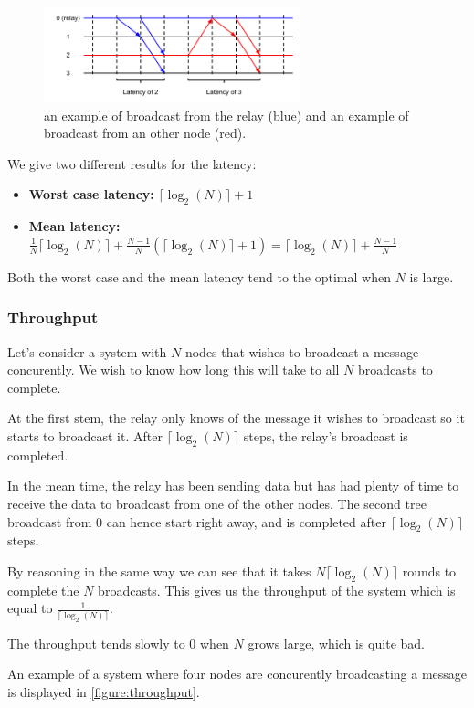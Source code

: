 \documentclass[a4paper]{article}
\begin{document}
\begin{figure}[h]
    \centering
    \includegraphics[width=280px]{Latency.png}
    \caption{an example of broadcast from the relay (blue) and an example of broadcast from an other node (red).}
    \label{figure:latency}
\end{figure}

We give two different results for the latency:
\begin{itemize}
    \item \textbf{Worst case latency:} $\lceil\log_2(N)\rceil + 1$
    \item \textbf{Mean latency:} $\frac{1}{N} \lceil\log_2(N)\rceil +
        \frac{N-1}{N} (\lceil\log_2(N)\rceil + 1)
        = \lceil\log_2(N)\rceil + \frac{N-1}{N}$
\end{itemize}

Both the worst case and the mean latency tend to the optimal when $N$ is
large.

\subsubsection*{Throughput}
Let's consider a system with $N$ nodes that wishes to broadcast a message
concurently. We wish to know how long this will take to all $N$ broadcasts
to complete.

At the first stem, the relay only knows of the message it wishes to broadcast
so it starts to broadcast it. After $\lceil\log_2(N)\rceil$ steps, the relay's
broadcast is completed.

In the mean time, the relay has been sending data but has had plenty of time
to receive the data to broadcast from one of the other nodes. The second tree
broadcast from $0$ can hence start right away, and is completed after
$\lceil\log_2(N)\rceil$ steps.

By reasoning in the same way we can see that it takes $N \lceil\log_2(N)\rceil$
rounds to complete the $N$ broadcasts. This gives us the throughput of the
system which is equal to $\frac{1}{\lceil\log_2(N)\rceil}$.

The throughput tends slowly to $0$ when $N$ grows large, which is quite bad.

An example of a system where four nodes are concurently broadcasting a message
is displayed in \ref{figure:throughput}.
\end{document}
